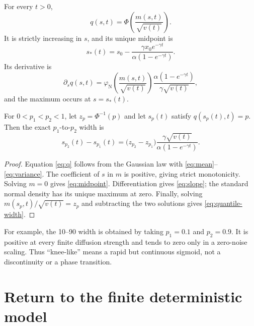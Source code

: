 \documentclass[11pt]{article}
\newcommand{\varphiN}{\varphi_{\mathrm{N}}}
\begin{document}
\begin{theorem}
\label{thm:threshold}
For every \(t>0\),
\begin{equation}
q(s,t)
=
\Phi\!\left(\frac{m(s,t)}{\sqrt{v(t)}}\right).
\label{eq:q}
\end{equation}
It is strictly increasing in \(s\), and its unique midpoint is
\begin{equation}
s_*(t)
=
s_0-\frac{\gamma x_0e^{-\gamma t}}
{\alpha(1-e^{-\gamma t})}.
\label{eq:midpoint}
\end{equation}
Its derivative is
\begin{equation}
\partial_s q(s,t)
=
\varphiN\!\left(\frac{m(s,t)}{\sqrt{v(t)}}\right)
\frac{\alpha(1-e^{-\gamma t})}
{\gamma\sqrt{v(t)}},
\label{eq:slope}
\end{equation}
and the maximum occurs at \(s=s_*(t)\).

For \(0<p_1<p_2<1\), let \(z_p=\Phi^{-1}(p)\) and let \(s_p(t)\) satisfy
\(q(s_p(t),t)=p\). Then the exact \(p_1\)-to-\(p_2\) width is
\begin{equation}
s_{p_2}(t)-s_{p_1}(t)
=
\bigl(z_{p_2}-z_{p_1}\bigr)
\frac{\gamma\sqrt{v(t)}}
{\alpha(1-e^{-\gamma t})}.
\label{eq:quantile-width}
\end{equation}
\end{theorem}

\begin{proof}
Equation \eqref{eq:q} follows from the Gaussian law with
\eqref{eq:mean}--\eqref{eq:variance}. The coefficient of \(s\) in \(m\) is positive, giving strict monotonicity. Solving \(m=0\) gives \eqref{eq:midpoint}. Differentiation gives \eqref{eq:slope}; the standard normal density has its unique maximum at zero. Finally, solving
\(m(s_p,t)/\sqrt{v(t)}=z_p\) and subtracting the two solutions gives
\eqref{eq:quantile-width}.
\end{proof}

For example, the 10--90 width is obtained by taking
\(p_1=0.1\) and \(p_2=0.9\). It is positive at every finite diffusion strength and tends to zero only in a zero-noise scaling. Thus ``knee-like'' means a rapid but continuous sigmoid, not a discontinuity or a phase transition.

\section{Return to the finite deterministic model}
\end{document}

